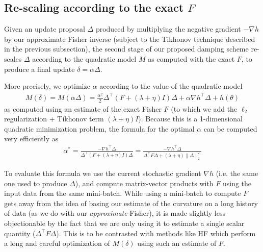 \documentclass[12pt]{article}
\begin{document}





\subsection{Re-scaling according to the exact $F$}
\label{sec:update_rescaling}

Given an update proposal $\Delta$ produced by multiplying the negative gradient $-\nabla h$ by our approximate Fisher inverse (subject to the Tikhonov technique described in the previous subsection), the second stage of our proposed damping scheme re-scales $\Delta$ according to the quadratic model $M$ as computed with the exact $F$, to produce a final update $\delta = \alpha \Delta$.

More precisely, we optimize $\alpha$ according to the value of the quadratic model
\begin{align*}
M(\delta) = M(\alpha \Delta) = \frac{\alpha^2}{2} \Delta^\top (F + (\lambda + \eta) I) \Delta + \alpha \nabla h^\top \Delta + h(\theta)
\end{align*}
as computed using an estimate of the exact Fisher $F$ (to which we add the $\ell_2$ regularization + Tikhonov term $(\lambda + \eta) I$). Because this is a 1-dimensional quadratic minimization problem, the formula for the optimal $\alpha$ can be computed very efficiently as
\begin{align*}
\alpha^* = \frac{-\nabla h^\top \Delta}{\Delta^\top (F + (\lambda + \eta)I ) \Delta} = \frac{-\nabla h^\top \Delta}{\Delta^\top F \Delta + (\lambda + \eta) \|\Delta\|_2^2}
\end{align*}

To evaluate this formula we use the current stochastic gradient $\nabla h$ (i.e. the same one used to produce $\Delta$), and compute matrix-vector products with $F$ using the input data from the same mini-batch.  While using a mini-batch to compute $F$ gets away from the idea of basing our estimate of the curvature on a long history of data (as we do with our \emph{approximate} Fisher), it is made slightly less objectionable by the fact that we are only using it to estimate a single scalar quantity ($\Delta^\top F \Delta$).  This is to be contrasted with methods like HF which perform a long and careful optimization of $M(\delta)$ using such an estimate of $F$.
\end{document}
